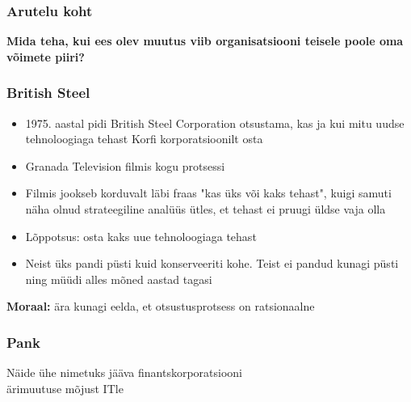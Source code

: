 \begin{frame}[fragile]
  \frametitle{Arutelu koht}
		\begin{center}
			\textbf{Mida teha, kui ees olev muutus viib organisatsiooni teisele poole oma võimete piiri?}
		\end{center}
\end{frame}

\begin{frame}[fragile]
  \frametitle{British Steel}
	\begin{itemize}
		\item 1975. aastal pidi British Steel Corporation otsustama, kas ja kui mitu uudse tehnoloogiaga tehast Korfi korporatsioonilt osta 
		\item Granada Television filmis kogu protsessi
		\item Filmis jookseb korduvalt läbi fraas "kas üks või kaks tehast", kuigi samuti näha olnud strateegiline analüüs ütles, et tehast ei pruugi üldse vaja olla
		\item Lõppotsus: osta kaks uue tehnoloogiaga tehast
		\item Neist üks pandi püsti kuid konserveeriti kohe. Teist ei pandud kunagi püsti ning müüdi alles mõned aastad tagasi
	\end{itemize}
	\begin{center}
		\textbf{Moraal:} ära kunagi eelda, et otsustusprotsess on ratsionaalne
	\end{center}
\end{frame}

\begin{frame}[fragile]
	\frametitle{Pank}
	\vfill
	\begin{center}
		Näide ühe nimetuks jääva finantskorporatsiooni\\ ärimuutuse mõjust ITle
	\end{center}
	\vfill
\end{frame}

